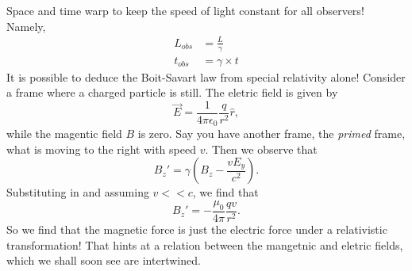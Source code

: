 \documentclass[nobib]{tufte-handout}
\begin{document}
Space and time warp to keep the speed of light constant 
for all observers! Namely, 
\begin{align}
    L_{obs} &= \frac{L}{\gamma} \\
    t_{obs} &= \gamma \times t 
\end{align}
It is possible to deduce the Boit-Savart law from special 
relativity alone! Consider a frame where a charged particle is still. 
The eletric field is given by 
\[\vec{E} = \frac{1}{4 \pi \epsilon_0} \frac{q}{r^2} \hat{r},\]
while the magentic field $B$ is zero. Say you have another frame, 
the \emph{primed} frame, what is moving to the right with speed $v$. 
Then we observe that 
\[B_z' = \gamma (B_z - \frac{v E_y}{c^2}).\]
Substituting in and assuming $v << c$, we find that 
\[B_z' =  -\frac{\mu_0}{4 \pi} \frac{qv}{r^2}.\]
So we find that the magnetic force is just the electric force under 
a relativistic transformation! That hints at a relation between the mangetnic 
and eletric fields, which we shall soon see are intertwined. 
\end{document}
